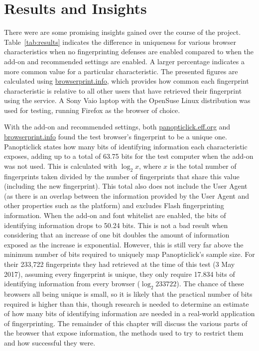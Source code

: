 \chapter{Results and Insights}

There were are some promising insights gained over the course of the project.
Table~\ref{tab:results} indicates the difference in uniqueness for various browser characteristics when no fingerprinting defenses are enabled compared to when the add-on and recommended settings are enabled.
A larger percentage indicates a more common value for a particular characteristic.
The presented figures are calculated using \url{browserprint.info}, which provides how common each fingerprint characteristic is relative to all other users that have retrieved their fingerprint using the service.
A Sony Vaio laptop with the OpenSuse Linux distribution was used for testing, running Firefox as the browser of choice.

With the add-on and recommended settings, both \url{panopticlick.eff.org} and \url{browserprint.info} found the test browser's fingerprint to be a unique one.
Panopticlick states how many bits of identifying information each characteristic exposes, adding up to a total of 63.75 bits for the test computer when the add-on was not used.
This is calculated with $\log_{2}x$, where $x$ is the total number of fingerprints taken divided by the number of fingerprints that share this value (including the new fingerprint).
This total also does not include the User Agent (as there is an overlap between the information provided by the User Agent and other properties such as the platform) and excludes Flash fingerprinting information.
When the add-on and font whitelist are enabled, the bits of identifying information drops to 50.24 bits.
This is not a bad result when considering that an increase of one bit doubles the amount of information exposed as the increase is exponential.
However, this is still very far above the minimum number of bits required to uniquely map Panopticlick's sample size.
For their 233,722 fingerprints they had retrieved at the time of this test (3 May 2017), assuming every fingerprint is unique, they only require 17.834 bits of identifying information from every browser ($\log_{2}233722$).
The chance of these browsers all being unique is small, so it is likely that the practical number of bits required is higher than this, though research is needed to determine an estimate of how many bits of identifying information are needed in a real-world application of fingerprinting.
The remainder of this chapter will discuss the various parts of the browser that expose information, the methods used to try to restrict them and how successful they were.

